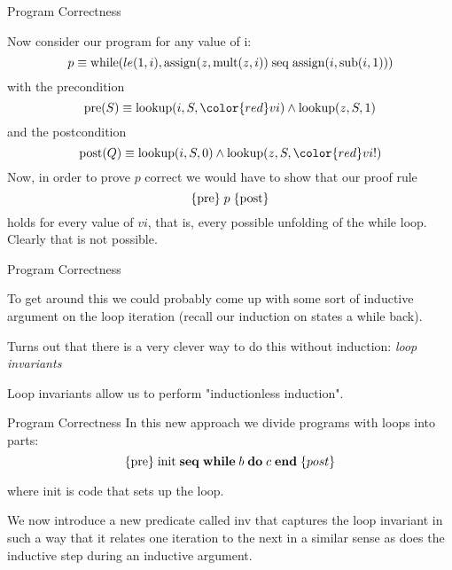 \documentclass{beamer}
\begin{document}
\begin{frame}[fragile]{Program Correctness}

\small

Now consider our program for any value of i:
\[
p \equiv {\rm while}(le(1,i), {\rm assign}(z,{\rm mult}(z,i)) \; {\rm seq}\; {\rm assign}(i,{\rm sub}(i,1)))
\]
with the precondition
\[
{\rm pre}(S) \equiv {\rm lookup}(i,S,{\color{red}vi}) \wedge {\rm lookup}(z,S,1)
\]
and the postcondition
\[
{\rm post}(Q) \equiv {\rm lookup}(i,S,0) \wedge {\rm lookup}(z,S,{\color{red}vi!})
\]
Now, in order to prove $p$ correct we would have to show that our proof rule
\[
\{{\rm pre}\}\; p \; \{{\rm post}\}
\]
holds for every value of $vi$, that is, every possible unfolding of the while loop.
Clearly that is not possible.
\end{frame}

\begin{frame}[fragile]{Program Correctness}

To get around this we could probably come up  with some sort of inductive argument
on the loop iteration (recall our induction on states a while back).

\vspace{.1in}

Turns out that there is a very clever way to do this without induction:  {\em loop invariants}

\vspace{.1in}

Loop invariants allow us to perform "inductionless induction".
\end{frame}



\begin{frame}[fragile]{Program Correctness}
In this new approach we divide programs with loops into parts:
\[
\{{\rm pre}\} \;{\rm init}\; {\bf seq}\; {\bf while}\; {b}\;{\bf do}\;{c}\; \mbox{\bf end}\;\{post\}
\]

where {\rm init} is code that sets up the loop.

\vspace{.1in}

We now introduce a new predicate called {\rm inv} that captures the loop invariant
in such a way that it relates one iteration to the next in a similar sense as does the inductive step
during an inductive argument.
\end{frame}
\end{document}
